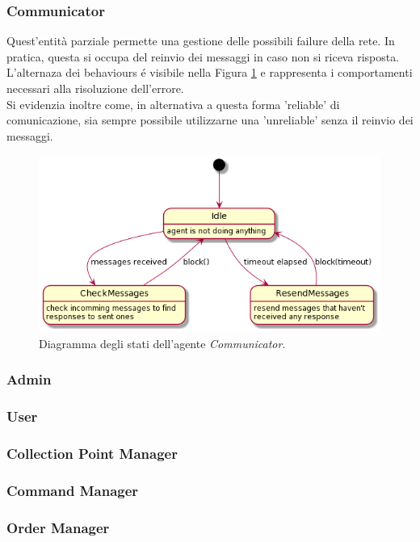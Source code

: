 \subsubsection{Communicator}
Quest'entità parziale permette una gestione delle possibili failure della rete. In pratica, questa si occupa del reinvio dei messaggi in caso non si riceva risposta.\\
L'alternaza dei behaviours \'e visibile nella Figura \ref{fig:communicator_state_diagrams} e rappresenta i comportamenti necessari alla risoluzione dell'errore.\\
Si evidenzia inoltre come, in alternativa a questa forma 'reliable' di comunicazione, sia sempre possibile utilizzarne una 'unreliable' senza il reinvio dei messaggi.
\begin{figure}[ht]
    \includegraphics[width=\textwidth]{section/design/figure/agent/communicator_states.png}
    \caption{Diagramma degli stati dell'agente \textit{Communicator}.}
    \label{fig:communicator_state_diagrams}
\end{figure}

\subsubsection{Admin}
\subsubsection{User}
\subsubsection{Collection Point Manager}
\subsubsection{Command Manager}
\subsubsection{Order Manager}
